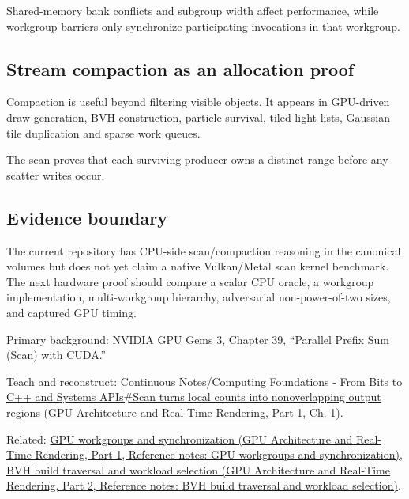 Shared-memory bank conflicts and subgroup width affect performance, while workgroup barriers only synchronize participating invocations in that workgroup.

\subsection{Stream compaction as an allocation proof}\label{appendix-f2ee4d086415-stream-compaction-as-an-allocation-proof}

\hypertarget{appendix-f2ee4d086415-stream-compaction-as-an-allocation-proof}{}

Compaction is useful beyond filtering visible objects. It appears in GPU-driven draw generation, BVH construction, particle survival, tiled light lists, Gaussian tile duplication and sparse work queues.

The scan proves that each surviving producer owns a distinct range before any scatter writes occur.

\subsection{Evidence boundary}\label{appendix-f2ee4d086415-evidence-boundary}

\hypertarget{appendix-f2ee4d086415-evidence-boundary}{}

The current repository has CPU-side scan/compaction reasoning in the canonical volumes but does not yet claim a native Vulkan/Metal scan kernel benchmark. The next hardware proof should compare a scalar CPU oracle, a workgroup implementation, multi-workgroup hierarchy, adversarial non-power-of-two sizes, and captured GPU timing.

Primary background: NVIDIA GPU Gems 3, Chapter 39, ``Parallel Prefix Sum (Scan) with CUDA.''

Teach and reconstruct: \href{../06-GPU-Architecture-and-Real-Time-Rendering-P01/main.pdf\#nameddest=01-foundations-i-ch008-scan-turns-local-counts-into-nonoverlapping-output-regions}{Continuous Notes/Computing Foundations - From Bits to C++ and Systems APIs\#Scan turns local counts into nonoverlapping output regions (GPU Architecture and Real-Time Rendering, Part 1, Ch. 1)}.

Related: \href{../06-GPU-Architecture-and-Real-Time-Rendering-P01/main.pdf\#nameddest=appendix-f662b5b1773b}{GPU workgroups and synchronization (GPU Architecture and Real-Time Rendering, Part 1, Reference notes: GPU workgroups and synchronization)}, \href{../06-GPU-Architecture-and-Real-Time-Rendering-P02/main.pdf\#nameddest=appendix-5653a7aea6bb}{BVH build traversal and workload selection (GPU Architecture and Real-Time Rendering, Part 2, Reference notes: BVH build traversal and workload selection)}.
